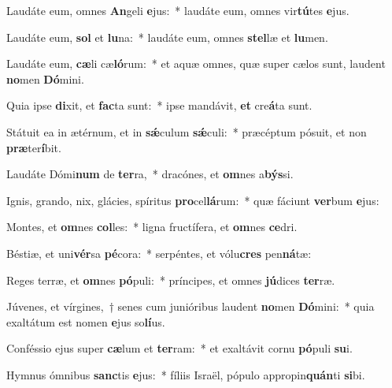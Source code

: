 \item Laudáte eum, omnes \textbf{An}geli \textbf{e}jus:~* laudáte eum, omnes vir\textbf{tú}tes \textbf{e}jus.
\item Laudáte eum, \textbf{sol} et \textbf{lu}na:~* laudáte eum, omnes \textbf{stel}læ et \textbf{lu}men.
\item Laudáte eum, \textbf{cæ}li cæ\textbf{ló}rum:~* et aquæ omnes, quæ super cælos sunt, laudent \textbf{no}men \textbf{Dó}mini.
\item Quia ipse \textbf{di}xit, et \textbf{fac}ta sunt:~* ipse mandávit, \textbf{et} cre\textbf{á}ta sunt.
\item Státuit ea in ætérnum, et in \textbf{sǽ}culum \textbf{sǽ}culi:~* præcéptum pósuit, et non \textbf{præ}ter\textbf{í}bit.
\item Laudáte Dómi\textbf{num} de \textbf{ter}ra,~* dracónes, et \textbf{om}nes a\textbf{býs}si.
\item Ignis, grando, nix, glácies, spíritus \textbf{pro}cel\textbf{lá}rum:~* quæ fáciunt \textbf{ver}bum \textbf{e}jus:
\item Montes, et \textbf{om}nes \textbf{col}les:~* ligna fructífera, et \textbf{om}nes \textbf{ce}dri.
\item Béstiæ, et uni\textbf{vér}sa \textbf{pé}cora:~* serpéntes, et vólu\textbf{cres} pen\textbf{ná}tæ:
\item Reges terræ, et \textbf{om}nes \textbf{pó}puli:~* príncipes, et omnes \textbf{jú}dices \textbf{ter}ræ.
\item Júvenes, et vírgines,~† senes cum junióribus laudent \textbf{no}men \textbf{Dó}mini:~* quia exaltátum est nomen \textbf{e}jus so\textbf{lí}us.
\item Conféssio ejus super \textbf{cæ}lum et \textbf{ter}ram:~* et exaltávit cornu \textbf{pó}puli \textbf{su}i.
\item Hymnus ómnibus \textbf{sanc}tis \textbf{e}jus:~* fíliis Israël, pópulo appropin\textbf{quán}ti \textbf{si}bi.
